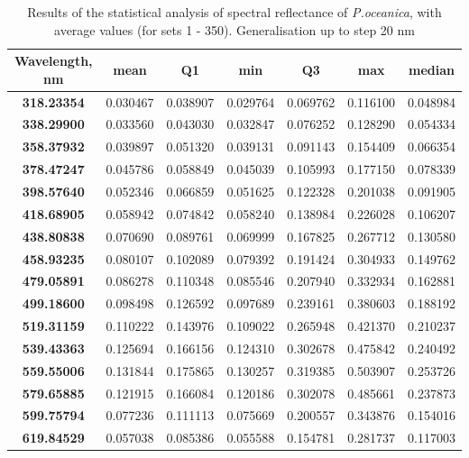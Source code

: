 \documentclass[11pt]{article}
\begin{document}
\begin{table}[htbp]
	\caption{Results of the statistical analysis of spectral reflectance of \textit{P.oceanica}, with average values (for sets 1 - 350). Generalisation up to step 20 nm}\label{tab:4.1}
	\begin{center}
	\begin{tabular}{|c|c|c|c|c|c|c|}
	\hline
	Wavelength, nm & mean & Q1 & min & Q3 & max & median \\ \hline
		\textbf{318.23354} & 0.030467 & 0.038907 & 0.029764 & 0.069762 & 0.116100 & 0.048984 \\ \hline
		\textbf{338.29900} & 0.033560 & 0.043030 & 0.032847 & 0.076252 & 0.128290 & 0.054334 \\ \hline
		\textbf{358.37932} & 0.039897 & 0.051320 & 0.039131 & 0.091143 & 0.154409 & 0.066354 \\ \hline
		\textbf{378.47247} & 0.045786 & 0.058849 & 0.045039 & 0.105993 & 0.177150 & 0.078339 \\ \hline
		\textbf{398.57640} & 0.052346 & 0.066859 & 0.051625 & 0.122328 & 0.201038 & 0.091905 \\ \hline
		\textbf{418.68905} & 0.058942 & 0.074842 & 0.058240 & 0.138984 & 0.226028 & 0.106207 \\ \hline
		\textbf{438.80838} & 0.070690 & 0.089761 & 0.069999 & 0.167825 & 0.267712 & 0.130580 \\ \hline
		\textbf{458.93235} & 0.080107 & 0.102089 & 0.079392 & 0.191424 & 0.304933 & 0.149762 \\ \hline
		\textbf{479.05891} & 0.086278 & 0.110348 & 0.085546 & 0.207940 & 0.332934 & 0.162881 \\ \hline
		\textbf{499.18600} & 0.098498 & 0.126592 & 0.097689 & 0.239161 & 0.380603 & 0.188192 \\ \hline
		\textbf{519.31159} & 0.110222 & 0.143976 & 0.109022 & 0.265948 & 0.421370 & 0.210237 \\ \hline
		\textbf{539.43363} & 0.125694 & 0.166156 & 0.124310 & 0.302678 & 0.475842 & 0.240492 \\ \hline
		\textbf{559.55006} & 0.131844 & 0.175865 & 0.130257 & 0.319385 & 0.503907 & 0.253726 \\ \hline
		\textbf{579.65885} & 0.121915 & 0.166084 & 0.120186 & 0.302078 & 0.485661 & 0.237873 \\ \hline
		\textbf{599.75794} & 0.077236 & 0.111113 & 0.075669 & 0.200557 & 0.343876 & 0.154016 \\ \hline
		\textbf{619.84529} & 0.057038 & 0.085386 & 0.055588 & 0.154781 & 0.281737 & 0.117003 \\ \hline

\end{tabular}
\end{center}
\end{table}
\end{document}
